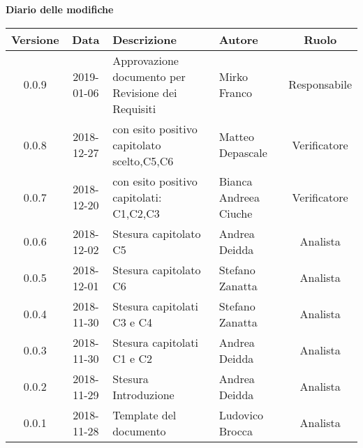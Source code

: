 \begin{center}
		\textbf{Diario delle modifiche}
	\end{center}
	\begin{center}
		\begin{tabularx}{\textwidth}{|c|c|X|X|c|}
			\hline
			\textbf{Versione} & \textbf{Data} & \textbf{Descrizione} & \textbf{Autore} & \textbf{Ruolo} \\
			\hline
			0.0.9 & 2019-01-06 & Approvazione documento per Revisione dei Requisiti & Mirko Franco & Responsabile \\
			\hline
			0.0.8 & 2018-12-27 & \glossario{Verifica} con esito positivo capitolato scelto,C5,C6  & Matteo Depascale & Verificatore \\
			\hline 
			0.0.7 & 2018-12-20 & \glossario{Verifica} con esito positivo  capitolati: C1,C2,C3 & Bianca Andreea Ciuche & Verificatore \\
			\hline
			0.0.6 & 2018-12-02 & Stesura capitolato C5& Andrea Deidda & Analista \\
			\hline
			0.0.5 & 2018-12-01 & Stesura capitolato C6 & Stefano Zanatta & Analista \\
			\hline
			0.0.4 & 2018-11-30 & Stesura capitolati C3 e C4 & Stefano Zanatta & Analista \\
			\hline
			0.0.3 & 2018-11-30 & Stesura capitolati C1 e C2 & Andrea Deidda & Analista \\
			\hline
			0.0.2 & 2018-11-29 & Stesura Introduzione & Andrea Deidda & Analista \\
			\hline
			0.0.1 &  2018-11-28& Template  del documento & Ludovico Brocca & Analista\\
			\hline
		\end{tabularx}
	\end{center}
\newpage